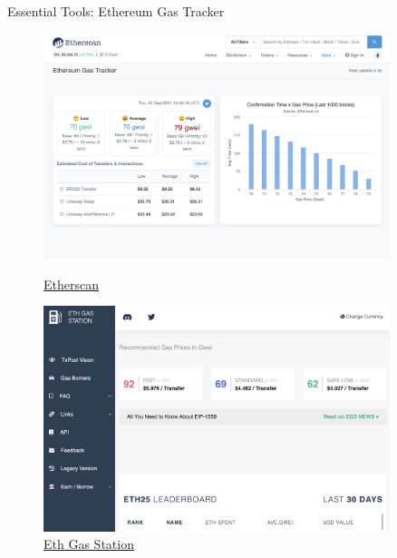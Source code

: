 \documentclass[handout]{beamer}
\begin{document}
\begin{frame}{Essential Tools: Ethereum Gas Tracker}
	\begin{figure}
	\centering
	\begin{minipage}{.45\textwidth}
  		\centering
  		\includegraphics[width=0.9\textwidth]{../assets/images/Etherscan.png}
  		\caption*{\footnotesize \href{https://etherscan.io/}{\link Etherscan}}
	\end{minipage}
	\begin{minipage}{.45\textwidth}
  		\centering
  		\includegraphics[width=0.9\textwidth]{../assets/images/ethGasStation.png}
  		\caption*{\footnotesize \href{https://www.Ethgasstation.info}{\link Eth Gas Station}}
	\end{minipage}
	\end{figure}
\end{frame}
\end{document}

